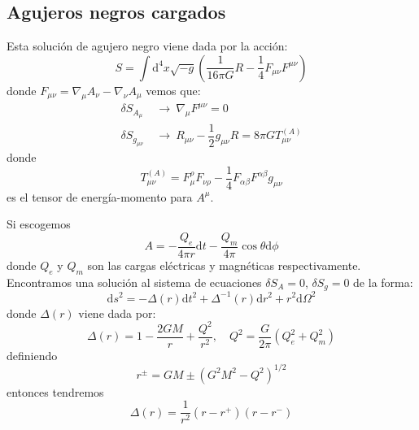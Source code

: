\documentclass[../main]{subfiles}
\begin{document}
\begin{adjustwidth}{0pt}{-100pt}
\section{Agujeros negros cargados}\label{part6.4}

Esta solución de agujero negro viene dada por la acción:
\begin{equation}
    S= \int \mathrm{d}^4 x \sqrt{-g}\left(\dfrac{1}{16\pi G}R-\dfrac{1}{4}F_{\mu\nu}F^{\mu\nu}\right)
\end{equation}
donde $F_{\mu\nu}=\nabla_{\mu} A_{\nu}-\nabla_{\nu}A_{\mu}$ vemos que:
\begin{equation}
    \begin{split}
        \delta S_{A_{\mu}} \ &\rightarrow \ \nabla_{\mu} F^{\mu\nu}=0\\
        \delta S_{g_{\mu\nu}} \ &\rightarrow \ R_{\mu\nu}-\dfrac{1}{2}g_{\mu\nu}R=8\pi G T_{\mu\nu}^{(A)} 
    \end{split}
\end{equation}
donde 
\begin{equation}
    T^{(A)}_{\mu\nu}=F^{\rho}_{\mu} F_{\nu\rho}-\dfrac{1}{4}F_{\alpha\beta}F^{\alpha\beta}g_{\mu\nu}
\end{equation}
es el tensor de energía-momento para $A^{\mu}$.

Si escogemos 
\begin{equation}
    A=-\dfrac{Q_e}{4\pi r}\mathrm{d}t-\dfrac{Q_m}{4\pi}\cos \theta \mathrm{d}\phi
\end{equation}
donde $Q_e$ y $Q_m$ son las cargas eléctricas y magnéticas respectivamente. Encontramos una solución al sistema de ecuaciones $\delta S_A=0$, $\delta S_g=0$ de la forma:
\begin{equation}
    \mathrm{d}s^2=-\Delta(r)\mathrm{d}t^2+\Delta^{-1}(r)\mathrm{d}r^2+r^2\mathrm{d}\Omega^2
\end{equation}
donde $\Delta(r)$ viene dada por:
\begin{equation}
    \Delta(r)=1-\dfrac{2GM}{r}+\dfrac{Q^2}{r^2},\quad Q^2=\dfrac{G}{2\pi}(Q^2_e+Q^2_m)
\end{equation}
definiendo 
\begin{equation}
    r^{\pm}=GM\pm (G^2M^2-Q^2)^{1/2}
\end{equation}
entonces tendremos
\begin{equation}
    \Delta(r)=\dfrac{1}{r^2}(r-r^+)(r-r^-)
\end{equation}


\end{adjustwidth}
\end{document}

